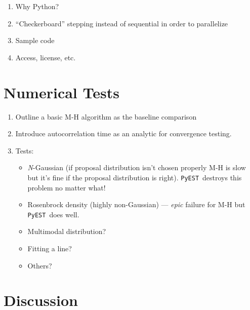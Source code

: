 \documentclass[12pt,preprint]{aastex}
\newcommand{\project}[1]{\texttt{#1}}
\newcommand{\this}{\project{PyEST}}
\begin{document}
\begin{enumerate}

    \item Why Python?

    \item ``Checkerboard'' stepping instead of sequential in order to parallelize

    \item Sample code

    \item Access, license, etc.

\end{enumerate}

\section{Numerical Tests}

\begin{enumerate}

    \item Outline a basic M-H algorithm as the baseline comparison

    \item Introduce autocorrelation time as an analytic for convergence testing.

    \item Tests:
        \begin{itemize}
            \item \emph{N}-Gaussian (if proposal distribution isn't chosen properly
                M-H is slow but it's fine if the proposal distribution is right).
                \this~destroys this problem no matter what!

            \item Rosenbrock density (highly non-Gaussian) --- \emph{epic} failure
                for M-H but \this~does well.

            \item Multimodal distribution?

            \item Fitting a line?

            \item Others?
        \end{itemize}

\end{enumerate}

\section{Discussion}
\end{document}
